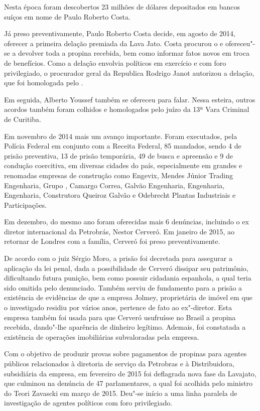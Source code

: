 Nesta época foram descobertos 23 milhões de dólares depositados em
bancos suíços em nome de Paulo Roberto Costa.

Já preso preventivamente, Paulo Roberto Costa decide, em agosto de 2014,
oferecer a primeira delação premiada da Lava Jato. Costa procurou o 
e ofereceu"-se a devolver toda a propina recebida, bem como informar
fatos novos em troca de benefícios. Como a delação envolvia políticos em
exercício e com foro privilegiado, o procurador geral da Republica
Rodrigo Janot autorizou a delação, que foi homologada pelo .

Em seguida, Alberto Youssef também se ofereceu para falar. Nessa
esteira, outros acordos também foram colhidos e homologados pelo juízo
da 13ª Vara Criminal de Curitiba.

Em novembro de 2014 mais um avanço importante. Foram executados, pela
Polícia Federal em conjunto com a Receita Federal, 85 mandados, sendo 4
de prisão preventiva, 13 de prisão temporária, 49 de busca e apreensão e
9 de condução coercitiva, em diversas cidades do país, especialmente em
grandes e renomadas empresas de construção como Engevix, Mendes Júnior
Trading Engenharia, Grupo , Camargo Correa, Galvão Engenharia, 
Engenharia,  Engenharia, Construtora Queiroz Galvão e Odebrecht
Plantas Industriais e Participações.

Em dezembro, do mesmo ano foram oferecidas mais 6 denúncias, incluindo o
ex diretor internacional da Petrobrás, Nestor Cerveró. Em janeiro de
2015, ao retornar de Londres com a família, Cerveró foi preso
preventivamente.

De acordo com o juiz Sérgio Moro, a prisão foi decretada para assegurar
a aplicação da lei penal, dada a possibilidade de Cerveró dissipar seu
patrimônio, dificultando futura punição, bem como possuir cidadania
espanhola, a qual teria sido omitida pelo denunciado. Também serviu de
fundamento para a prisão a existência de evidências de que a empresa
Jolmey, proprietária de imóvel em que o investigado residiu por vários
anos, pertence de fato ao ex"-diretor. Esta empresa também foi usada para
que Cerveró usufruísse no Brasil a propina recebida, dando"-lhe aparência
de dinheiro legítimo. Ademais, foi constatada a existência de operações
imobiliárias subvaloradas pela empresa.

Com o objetivo de produzir provas sobre pagamentos de propinas para
agentes públicos relacionados à diretoria de serviço da Petrobras e à 
Distribuidora, subsidiária da empresa, em fevereiro de 2015 foi
deflagrada nova fase da Lavajato, que culminou na denúncia de 47
parlamentares, a qual foi acolhida pelo ministro do  Teori Zavascki
em março de 2015. Deu"-se início a uma linha paralela de investigação de
agentes políticos com foro privilegiado.

